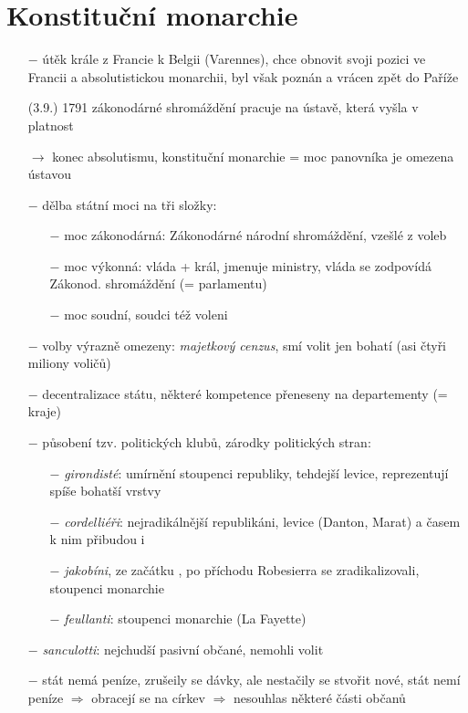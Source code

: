 \documentclass{article}
\begin{document}
\section*{Konstituční monarchie}
\begin{itemize}
    \vspace{-0.5em}
    \setlength\itemsep{0.15em}
    \item[$-$] útěk krále z Francie k Belgii (Varennes), chce obnovit svoji pozici ve Francii a absolutistickou monarchii, byl však poznán a vrácen zpět do Paříže
    \item[(3.9.) 1791] zákonodárné shromáždění pracuje na ústavě, která vyšla v platnost
    \item[$\rightarrow$] konec absolutismu, konstituční monarchie = moc panovníka je omezena ústavou
    \item[$-$] dělba státní moci na tři složky:
    \begin{itemize}
        \vspace{-0.5em}
        \setlength\itemsep{0.15em}
        \item[$-$] moc zákonodárná: Zákonodárné národní shromáždění, vzešlé z voleb
        \item[$-$] moc výkonná: vláda + král, jmenuje ministry, vláda se zodpovídá Zákonod. shromáždění (= parlamentu)
        \item[$-$] moc soudní, soudci též voleni
    \end{itemize}
    \item[$-$] volby výrazně omezeny: \textit{majetkový cenzus}, smí volit jen bohatí (asi čtyři miliony voličů)
    \item[$-$] decentralizace státu, některé kompetence přeneseny na departementy (= kraje)
    \item[$-$] působení tzv. politických klubů, zárodky politických stran:
    \begin{itemize}
        \vspace{-0.5em}
        \setlength\itemsep{0.15em}
        \item[$-$] \textit{girondisté}: umírnění stoupenci republiky, tehdejší levice, reprezentují spíše bohatší vrstvy
        \item[$-$] \textit{cordelliéři}: nejradikálnější republikáni, levice (Danton, Marat) a časem k nim přibudou i \item[$-$] \textit{jakobíni}, ze začátku , po příchodu Robesierra se zradikalizovali, stoupenci monarchie
        \item[$-$] \textit{feullanti}: stoupenci monarchie (La Fayette)
    \end{itemize}
    \item[$-$] \textit{sanculotti}: nejchudší pasivní občané, nemohli volit
    \item[$-$] stát nemá peníze, zrušeily se dávky, ale nestačily se stvořit nové, stát nemí peníze $\Rightarrow$ obracejí se na církev $\Rightarrow$ nesouhlas některé části občanů
\end{itemize}
\end{document}
